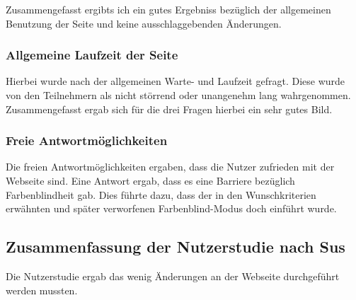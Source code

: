 \noChanges

Zusammengefasst ergibts ich ein gutes Ergebniss bezüglich der allgemeinen Benutzung der Seite und keine ausschlaggebenden Änderungen.
\subsubsection{Allgemeine Laufzeit der Seite}
Hierbei wurde nach der allgemeinen Warte- und Laufzeit gefragt. Diese wurde von den Teilnehmern als nicht störrend oder unangenehm lang wahrgenommen.
Zusammengefasst ergab sich für die drei Fragen hierbei ein sehr gutes Bild. 

\subsubsection{Freie Antwortmöglichkeiten}
Die freien Antwortmöglichkeiten ergaben, dass die Nutzer zufrieden mit der Webseite sind. 
Eine Antwort ergab, dass es eine Barriere bezüglich Farbenblindheit gab.
Dies führte dazu, dass der in den Wunschkriterien erwähnten und später verworfenen Farbenblind-Modus doch einführt wurde. 

\subsection{Zusammenfassung der Nutzerstudie nach Sus}

Die Nutzerstudie ergab das wenig Änderungen an der Webseite durchgeführt werden mussten.
